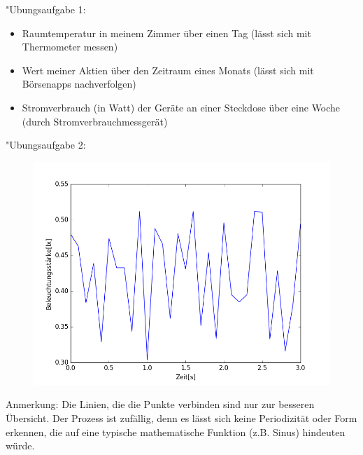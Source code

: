 \documentclass[fleqn,a4paper,12pt]{article}
\begin{document}
"Ubungsaufgabe 1: \newline
\begin{itemize}
  \item Raumtemperatur in meinem Zimmer über einen Tag (lässt sich mit Thermometer messen)
  \item Wert meiner Aktien über den Zeitraum eines Monats (lässt sich mit Börsenapps nachverfolgen)
  \item Stromverbrauch (in Watt) der Geräte an einer Steckdose über eine Woche (durch Stromverbrauchmessgerät)
\end{itemize}
\newpage
"Ubungsaufgabe 2:\newline
\begin{figure}
  \includegraphics[width=1.0\textwidth]{signal.png}
\end{figure}
Anmerkung: Die Linien, die die Punkte verbinden sind nur zur besseren Übersicht.\newline
Der Prozess ist zufällig, denn es lässt sich keine Periodizität oder Form erkennen, die auf eine typische mathematische Funktion (z.B. Sinus) hindeuten würde.
\end{document}
